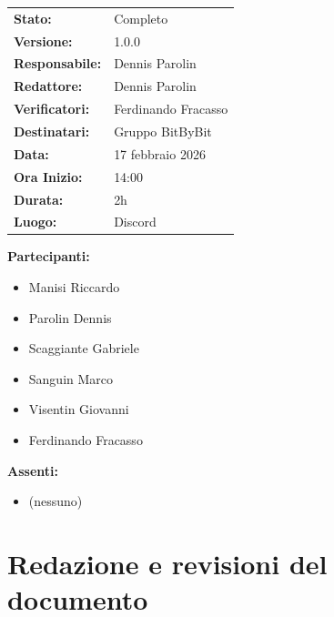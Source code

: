 \documentclass[a4paper,12pt]{article}
\begin{document}
\begin{tcolorbox}
\begin{tabularx}{\textwidth}{@{}l X@{}}
\textbf{Stato:} & Completo\\
\textbf{Versione:} & 1.0.0\\
\textbf{Responsabile:} & Dennis Parolin\\
\textbf{Redattore:} & Dennis Parolin \\
\textbf{Verificatori:} & Ferdinando Fracasso\\
\textbf{Destinatari:} & Gruppo BitByBit\\
\textbf{Data:} & 17 febbraio 2026 \\
\textbf{Ora Inizio:} & 14:00 \\
\textbf{Durata:} & 2h \\
\textbf{Luogo:} & Discord \\
\end{tabularx}
\end{tcolorbox}

\vspace{0.4cm}
\textbf{Partecipanti:}
\begin{itemize}
    \item Manisi Riccardo
    \item Parolin Dennis
    \item Scaggiante Gabriele
    \item Sanguin Marco
    \item Visentin Giovanni
    \item Ferdinando Fracasso
\end{itemize}

\textbf{Assenti:}
\begin{itemize}
    \item (nessuno)
\end{itemize}

\clearpage

\vspace{0.5cm}

\vspace{0.8cm}

\clearpage
\section*{Redazione e revisioni del documento}
\end{document}
